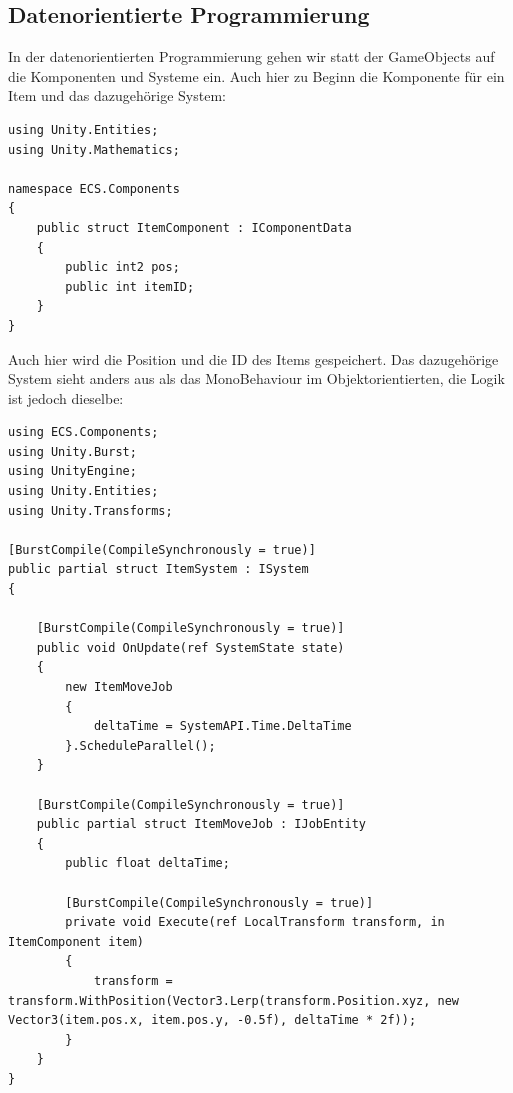 \documentclass[12pt, titlepage]{article}
\begin{document}
\subsection{Datenorientierte Programmierung}
In der datenorientierten Programmierung gehen wir statt der GameObjects auf die Komponenten und Systeme ein. Auch hier zu Beginn die Komponente für ein Item und das dazugehörige System:
\begin{lstlisting}[style=code, caption={Item Komponente ECS}]
using Unity.Entities;
using Unity.Mathematics;

namespace ECS.Components
{
    public struct ItemComponent : IComponentData
    {
        public int2 pos;
        public int itemID;
    }
}
\end{lstlisting}
Auch hier wird die Position und die ID des Items gespeichert. Das dazugehörige System sieht anders aus als das MonoBehaviour im Objektorientierten, die Logik ist jedoch dieselbe:
\begin{lstlisting}[style=code, caption={Item System}]
using ECS.Components;
using Unity.Burst;
using UnityEngine;
using Unity.Entities;
using Unity.Transforms;

[BurstCompile(CompileSynchronously = true)]
public partial struct ItemSystem : ISystem
{
    
    [BurstCompile(CompileSynchronously = true)]
    public void OnUpdate(ref SystemState state)
    {
        new ItemMoveJob
        {
            deltaTime = SystemAPI.Time.DeltaTime
        }.ScheduleParallel();
    }

    [BurstCompile(CompileSynchronously = true)]
    public partial struct ItemMoveJob : IJobEntity
    {
        public float deltaTime;
        
        [BurstCompile(CompileSynchronously = true)]
        private void Execute(ref LocalTransform transform, in ItemComponent item)
        {
            transform = transform.WithPosition(Vector3.Lerp(transform.Position.xyz, new Vector3(item.pos.x, item.pos.y, -0.5f), deltaTime * 2f));
        }
    }
}
\end{lstlisting}
\end{document}
